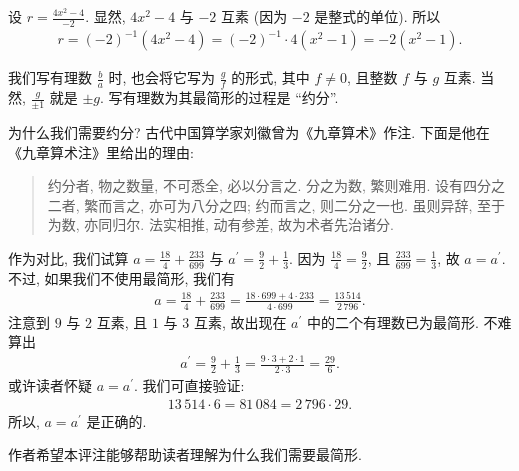 \begin{example}
    设 $r = \frac{4x^2 - 4}{-2}$. 显然, $4x^2 - 4$ 与 $-2$ 互素 (因为 $-2$ 是整式的单位). 所以
    \begin{align*}
        r = (-2)^{-1} (4x^2 - 4) = (-2)^{-1} \cdot 4(x^2 - 1) = -2(x^2 - 1).
    \end{align*}
\end{example}

\begin{remark}
    我们写有理数 $\frac{b}{a}$ 时, 也会将它写为 $\frac{g}{f}$ 的形式, 其中 $f \neq 0$, 且整数 $f$ 与 $g$ 互素. 当然, $\frac{g}{\pm 1}$ 就是 $\pm g$. 写有理数为其最简形的过程是 ``约分''.

    为什么我们需要约分? 古代中国算学家刘徽曾为《九章算术》作注. 下面是他在《九章算术注》里给出的理由:
    \begin{quotation}
        约分者, 物之数量, 不可悉全, 必以分言之. 分之为数, 繁则难用. 设有四分之二者, 繁而言之, 亦可为八分之四; 约而言之, 则二分之一也. 虽则异辞, 至于为数, 亦同归尔. 法实相推, 动有参差, 故为术者先治诸分.
    \end{quotation}

    作为对比, 我们试算 $a = \frac{18}{4} + \frac{233}{699}$ 与 $a^{\prime} = \frac{9}{2} + \frac{1}{3}$. 因为 $\frac{18}{4} = \frac{9}{2}$, 且 $\frac{233}{699} = \frac{1}{3}$, 故 $a = a^{\prime}$. 不过, 如果我们不使用最简形, 我们有
    \begin{align*}
        a = \frac{18}{4} + \frac{233}{699} = \frac{18 \cdot 699 + 4 \cdot 233}{4 \cdot 699} = \frac{13\,514}{2\,796}.
    \end{align*}
    注意到 $9$ 与 $2$ 互素, 且 $1$ 与 $3$ 互素, 故出现在 $a^{\prime}$ 中的二个有理数已为最简形. 不难算出
    \begin{align*}
        a^{\prime} = \frac{9}{2} + \frac{1}{3} = \frac{9 \cdot 3 + 2 \cdot 1}{2 \cdot 3} = \frac{29}{6}.
    \end{align*}
    或许读者怀疑 $a = a^{\prime}$. 我们可直接验证:
    \begin{align*}
        13\,514 \cdot 6 = 81\,084 = 2\,796 \cdot 29.
    \end{align*}
    所以, $a = a^{\prime}$ 是正确的.

    作者希望本评注能够帮助读者理解为什么我们需要最简形.
\end{remark}

